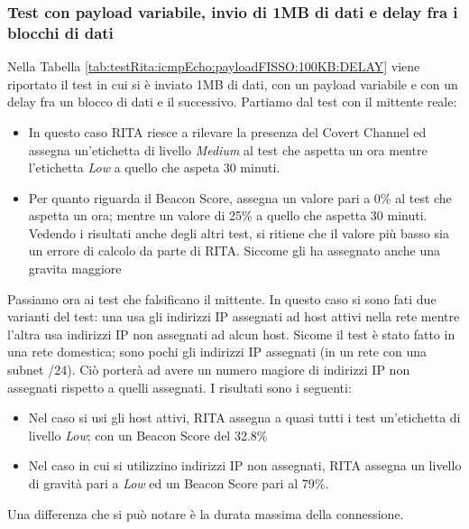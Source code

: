 \subsubsection{Test con payload variabile, invio di 1MB di dati e delay fra i blocchi di dati}  
Nella Tabella \ref{tab:testRita:icmpEcho:payloadFISSO:100KB:DELAY} viene riportato 
il test in cui si è inviato 1MB di dati, con un payload variabile e con 
un delay fra un blocco di dati e il successivo. 
\vspace{1ex} \newline 
Partiamo dal test con il mittente reale: 
\begin{itemize} 
    \item[] In questo caso RITA riesce a rilevare la presenza del Covert 
    Channel ed assegna un'etichetta di livello \textit{Medium} al test che 
    aspetta un ora mentre l'etichetta \textit{Low} a quello che aspeta 30 minuti. 
    \item[] Per quanto riguarda il Beacon Score, assegna un valore pari a 
    0\% al test che aspetta un ora; mentre un valore di 25\% a quello che 
    aspetta 30 minuti. Vedendo i risultati anche degli altri test, si ritiene 
    che il valore più basso sia un errore di calcolo da parte di RITA. 
    Siccome gli ha assegnato anche una gravita maggiore
\end{itemize} 
\vspace{4ex}  
Passiamo ora ai test che falsificano il mittente. 
In questo caso si sono fati due varianti del test: una usa gli indirizzi IP 
assegnati ad host attivi nella rete mentre l'altra usa indirizzi IP non 
assegnati ad alcun host. Sicome il test è stato fatto in una rete domestica; 
sono pochi gli indirizzi IP assegnati (in un rete con una subnet /24). 
Ciò porterà ad avere un numero magiore di indirizzi IP non assegnati 
rispetto a quelli assegnati. 
\vspace{1ex} \newline 
I risultati sono i seguenti: 
\begin{itemize} 
    \item[] Nel caso si usi gli host attivi, RITA assegna a quasi tutti i test 
    un'etichetta di livello \textit{Low}; con un Beacon Score del 32.8\%
    \item[] Nel caso in cui si utilizzino indirizzi IP non assegnati, RITA 
    assegna un livello di gravità pari a \textit{Low} ed un Beacon Score pari 
    al 79\%. 
\end{itemize} 
Una differenza che si può notare è la durata massima della connessione. 
